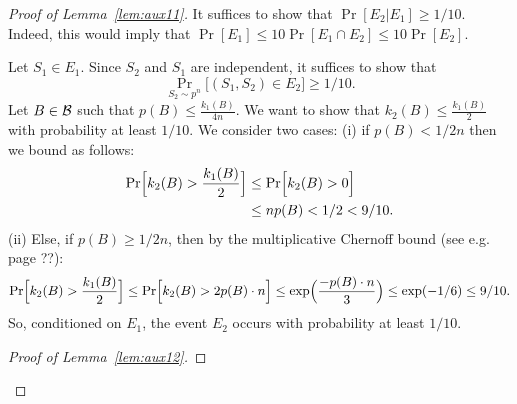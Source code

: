 \documentclass{article}
\newcommand{\B}{{\cal B}}
\begin{document}
\begin{proof}[Proof of Lemma~\ref{lem:aux11}]
It suffices to show that $\Pr[E_2 \vert E_1]\geq 1/10$.
Indeed, this would imply that 
$\Pr[E_1] \leq 10\Pr[E_1 \cap E_2]\leq 10\Pr[E_2]$.

Let $S_1\in E_1$. Since $S_2$ and $S_1$ are independent,
it suffices to show that 
\[\Pr_{S_2\sim p^n}\bigl[(S_1,S_2)\in E_2\bigr] \geq 1/10.\]
Let $B\in\B$ such that $p(B)\leq \frac{k_{1}(B)}{4n}$.
We want to show that $k_{2}(B)\leq \frac{k_{1}(B)}{2}$ with probability at least $1/10$.
We consider two cases:
(i) if $p(B) < 1/2n$
then we bound as follows:
\begin{align*}
\Pr\Bigl[ k_{2}(B) > \frac{k_{1}(B)}{2}\Bigr]
&\leq
\Pr\Bigl[ k_{2}(B) > 0 \Bigr]\\
&\leq np(B) < 1/2 < 9/10.
\end{align*}
(ii) Else, if $p(B) \geq 1/2n$, then by the multiplicative Chernoff bound (see e.g.\cite{} page ??):
\[
\Pr\Bigl[ k_{2}(B) > \frac{k_{1}(B)}{2}\Bigr]
\leq
\Pr\Bigl[ k_{2}(B) > 2p(B)\cdot n\Bigr]
\leq
\exp\Bigl( \frac{-p(B)\cdot n}{3}\Bigr)\leq \exp(-1/6)\leq 9/10.
\]
So, conditioned on $E_1$, 
the event $E_2$ occurs with probability at least $1/10$.

\begin{proof}[Proof of Lemma~\ref{lem:aux12}]


\end{proof}
\end{proof}
\end{document}
